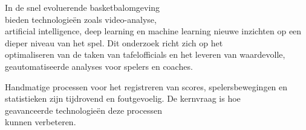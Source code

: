 



In de snel evoluerende basketbalomgeving \\bieden technologieën zoals video-analyse, \\artificial intelligence, deep learning en machine learning nieuwe inzichten op een dieper niveau van het spel. %
Dit onderzoek richt zich op het \\optimaliseren van de taken van tafelofficials en het leveren van waardevolle, geautomatiseerde analyses voor spelers en coaches.

Handmatige processen voor het registreren van scores, spelersbewegingen en statistieken zijn tijdrovend en foutgevoelig. De kernvraag is hoe \\geavanceerde technologieën deze processen \\kunnen verbeteren.


